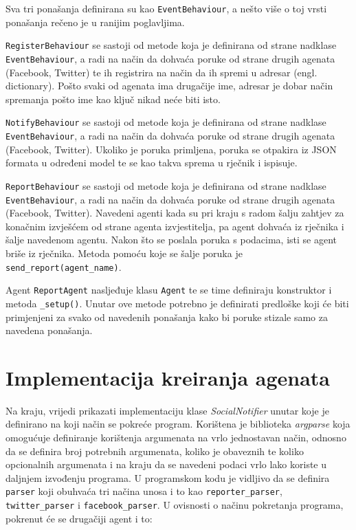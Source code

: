 \documentclass[a4paper,12pt]{foi}
\begin{document}
Sva tri ponašanja definirana su kao \texttt{EventBehaviour}, a nešto više o toj vrsti ponašanja rečeno je u ranijim poglavljima.

\texttt{RegisterBehaviour} se sastoji od metode koja je definirana od strane nadklase \texttt{EventBehaviour}, a radi na način da dohvaća poruke od strane drugih agenata (Facebook, Twitter) te ih registrira na način da ih spremi u adresar (engl. dictionary). Pošto svaki od agenata ima drugačije ime, adresar je dobar način spremanja pošto ime kao ključ nikad neće biti isto.

\texttt{NotifyBehaviour} se sastoji od metode koja je definirana od strane nadklase \texttt{EventBehaviour}, a radi na način da dohvaća poruke od strane drugih agenata (Facebook, Twitter). Ukoliko je poruka primljena, poruka se otpakira iz JSON formata u određeni model te se kao takva sprema u rječnik i ispisuje.

\texttt{ReportBehaviour} se sastoji od metode koja je definirana od strane nadklase \texttt{EventBehaviour}, a radi na način da dohvaća poruke od strane drugih agenata (Facebook, Twitter). Navedeni agenti kada su pri kraju s radom šalju zahtjev za konačnim izvješćem od strane agenta izvjestitelja, pa agent dohvaća iz rječnika i šalje navedenom agentu. Nakon što se poslala poruka s podacima, isti se agent briše iz rječnika. Metoda pomoću koje se šalje poruka je \texttt{send\_report(agent\_name)}.

Agent \texttt{ReportAgent} nasljeđuje klasu \texttt{Agent} te se time definiraju konstruktor i metoda \texttt{\_setup()}. Unutar ove metode potrebno je definirati predloške koji će biti primjenjeni za svako od navedenih ponašanja kako bi poruke stizale samo za navedena ponašanja.

\lstset{commentstyle=\textit,language=python}


\section{Implementacija kreiranja agenata}

Na kraju, vrijedi prikazati implementaciju klase \textit{SocialNotifier} unutar koje je definirano na koji način se pokreće program. Korištena je biblioteka \textit{argparse} koja omogućuje definiranje korištenja argumenata na vrlo jednostavan način, odnosno da se definira broj potrebnih argumenata, koliko je obaveznih te koliko opcionalnih argumenata i na kraju da se navedeni podaci vrlo lako koriste u daljnjem izvođenju programa. U programskom kodu je vidljivo da se definira \texttt{parser} koji obuhvaća tri načina unosa i to kao \texttt{reporter\_parser}, \texttt{twitter\_parser} i \texttt{facebook\_parser}. U ovisnosti o načinu pokretanja programa, pokrenut će se drugačiji agent i to:
\end{document}
